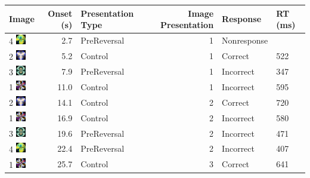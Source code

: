 \documentclass[]{article}
\begin{document}
\begin{longtable}[]{@{}lrlrll@{}}
\toprule
Image & Onset (s) & Presentation Type & Image Presentation & Response &
RT (ms)\tabularnewline
\midrule
\endhead
4
\includegraphics[width=0.16670in,height=0.16670in]{../ReversalLearning_20130621/images/abs4.jpg}
& 2.7 & PreReversal & 1 & Nonresponse &\tabularnewline
2
\includegraphics[width=0.16670in,height=0.16670in]{../ReversalLearning_20130621/images/abs2.jpg}
& 5.2 & Control & 1 & Correct & 522\tabularnewline
3
\includegraphics[width=0.16670in,height=0.16670in]{../ReversalLearning_20130621/images/abs3.jpg}
& 7.9 & PreReversal & 1 & Incorrect & 347\tabularnewline
1
\includegraphics[width=0.16670in,height=0.16670in]{../ReversalLearning_20130621/images/abs1.jpg}
& 11.0 & Control & 1 & Incorrect & 595\tabularnewline
2
\includegraphics[width=0.16670in,height=0.16670in]{../ReversalLearning_20130621/images/abs2.jpg}
& 14.1 & Control & 2 & Correct & 720\tabularnewline
1
\includegraphics[width=0.16670in,height=0.16670in]{../ReversalLearning_20130621/images/abs1.jpg}
& 16.9 & Control & 2 & Incorrect & 580\tabularnewline
3
\includegraphics[width=0.16670in,height=0.16670in]{../ReversalLearning_20130621/images/abs3.jpg}
& 19.6 & PreReversal & 2 & Incorrect & 471\tabularnewline
4
\includegraphics[width=0.16670in,height=0.16670in]{../ReversalLearning_20130621/images/abs4.jpg}
& 22.4 & PreReversal & 2 & Incorrect & 407\tabularnewline
1
\includegraphics[width=0.16670in,height=0.16670in]{../ReversalLearning_20130621/images/abs1.jpg}
& 25.7 & Control & 3 & Correct & 641\tabularnewline

\end{longtable}
\end{document}

